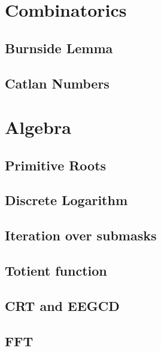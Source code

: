 \section{Combinatorics}
\subsection{Burnside Lemma}
\raggedbottom
\hrulefill
\subsection{Catlan Numbers}
\raggedbottom
\hrulefill

\section{Algebra}
\subsection{Primitive Roots}
\raggedbottom
\hrulefill
\subsection{Discrete Logarithm}
\raggedbottom
\hrulefill
\subsection{Iteration over submasks}
\raggedbottom
\hrulefill
\subsection{Totient function}
\raggedbottom
\hrulefill
\subsection{CRT and EEGCD}
\raggedbottom
\hrulefill
\subsection{FFT}
\raggedbottom
\hrulefill

